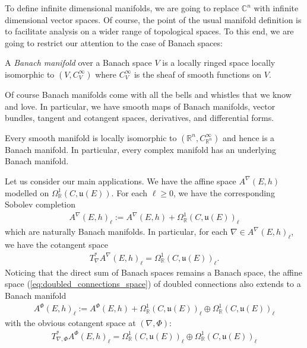 \documentclass[12pt]{ociamthesis}  %
\begin{document}
To define infinite dimensional manifolds, we are going to replace
$\mathbb{C}^n$ with infinite dimensional vector spaces. Of course,
the point of the usual manifold definition is to facilitate analysis
on a wider range of topological spaces. To this end, we are going to
restrict our attention to the case of Banach spaces:

\begin{definition}
  A \emph{Banach manifold} over a Banach space $V$ is a locally ringed
  space locally isomorphic to $(V,C^\infty_V)$ where $C^\infty_V$ is the
  sheaf of smooth functions on $V$.
\end{definition}

Of course Banach manifolds come with all the bells and whistles that
we know and love. In particular, we have smooth maps of Banach manifolds,
vector bundles, tangent and cotangent spaces, derivatives, and
differential forms. 

\begin{example}
  Every smooth manifold is locally isomorphic to
  $(\mathbb{R}^n,C^\infty_{\mathbb{R}^n})$ and hence is a Banach manifold.
  In particular, every complex manifold has an underlying Banach manifold.
\end{example}

\begin{example}
  Let us consider our main applications. We have the affine space
  $A^\nabla(E,h)$ modelled on $\Omega^1_{\mathbb{R}}(C,\mathfrak u(E))$.
  For each $\ell \geq 0$, we have the corresponding Sobolev completion
  \begin{align*}
    A^\nabla(E,h)_\ell := A^\nabla(E,h) + \Omega^1_{\mathbb{R}}(C,\mathfrak u(E))_\ell
  \end{align*}
  which are naturally Banach manifolds.
  In particular, for each $\nabla\in A^\nabla(E,h)_\ell$, we have the
  cotangent space
  \begin{align*}
    T^*_\nabla A^\nabla(E,h)_\ell
    = \Omega^1_{\mathbb{R}}(C,\mathfrak u(E))_\ell.
  \end{align*}
  Noticing that the direct sum of Banach spaces remains a Banach space,
  the affine space (\ref{eq:doubled_connections_space}) of doubled connections also
  extends to a Banach manifold
  \begin{align*}
    A^\Phi(E,h)_\ell := A^\Phi(E,h) + \Omega^1_{\mathbb{R}}(C,\mathfrak u(E))_\ell
    \oplus \Omega^1_{\mathbb{R}}(C,\mathfrak u(E))_\ell
  \end{align*}
  with the obvious cotangent space at $(\nabla,\Phi)$:
  \begin{align*}
    T^*_{\nabla,\Phi} A^\Phi(E,h)_\ell
    = \Omega^1_{\mathbb{R}}(C,\mathfrak u(E))_\ell
    \oplus \Omega^1_{\mathbb{R}}(C,\mathfrak u(E))_\ell
  \end{align*}
\end{example}
\end{document}
